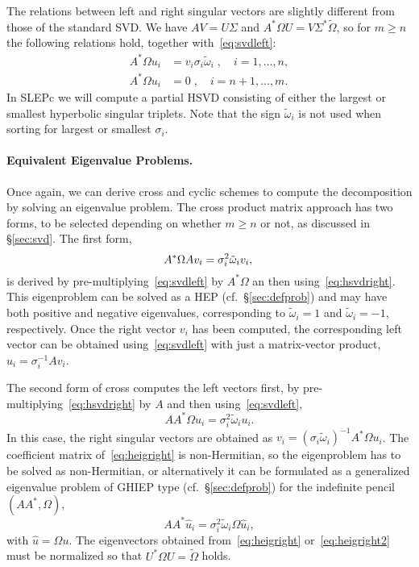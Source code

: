 The relations between left and right singular vectors are slightly different from those of the standard SVD. We have $AV=U\Sigma$ and $A^*\Omega U=V\Sigma^*\tilde\Omega$, so for $m\geq n$ the following relations hold, together with~\eqref{eq:svdleft}:
\begin{align}
\label{eq:hsvdright}
A^*\Omega u_i&=v_i\sigma_i\tilde\omega_i\;,\quad i=1,\ldots,n,\\
\label{eq:hsvdright2}
A^*\Omega u_i&=0\;,\quad i=n+1,\ldots,m.
\end{align}
In SLEPc we will compute a partial HSVD consisting of either the largest or smallest hyperbolic singular triplets. Note that the sign $\tilde\omega_i$ is not used when sorting for largest or smallest $\sigma_i$.

\paragraph{Equivalent Eigenvalue Problems.}
Once again, we can derive cross and cyclic schemes to compute the decomposition by solving an eigenvalue problem. The cross product matrix approach has two forms, to be selected depending on whether $m\geq n$ or not, as discussed in \S\ref{sec:svd}. The first form,
\begin{equation}
\label{eq:heigleft}
A^*\Omega Av_i=\sigma_i^2\tilde\omega_iv_i,\\
\end{equation}
is derived by pre-multiplying~\eqref{eq:svdleft} by $A^*\Omega$ an then using~\eqref{eq:hsvdright}. This eigenproblem can be solved as a HEP (cf.~\S\ref{sec:defprob}) and may have both positive and negative eigenvalues, corresponding to $\tilde\omega_i=1$ and $\tilde\omega_i=-1$, respectively. Once the right vector $v_i$ has been computed, the corresponding left vector can be obtained using~\eqref{eq:svdleft} with just a matrix-vector product, $u_i=\sigma_i^{-1}Av_i$.

The second form of cross computes the left vectors first, by pre-multiplying~\eqref{eq:hsvdright} by $A$ and then using~\eqref{eq:svdleft},
\begin{equation}
\label{eq:heigright}
AA^*\Omega u_i=\sigma_i^2\tilde\omega_iu_i.
\end{equation}
In this case, the right singular vectors are obtained as $v_i=(\sigma_i\tilde\omega_i)^{-1}A^*\Omega u_i$. The coefficient matrix of~\eqref{eq:heigright} is non-Hermitian, so the eigenproblem has to be solved as non-Hermitian, or alternatively it can be formulated as a generalized eigenvalue problem of GHIEP type (cf.~\S\ref{sec:defprob}) for the indefinite pencil $(AA^*,\Omega)$,
\begin{equation}
\label{eq:heigright2}
AA^*\hat{u}_i=\sigma_i^2\tilde\omega_i\Omega \hat{u}_i,
\end{equation}
with $\hat{u}=\Omega u$. The eigenvectors obtained from~\eqref{eq:heigright} or~\eqref{eq:heigright2} must be normalized so that $U^*\Omega U=\tilde\Omega$ holds.


